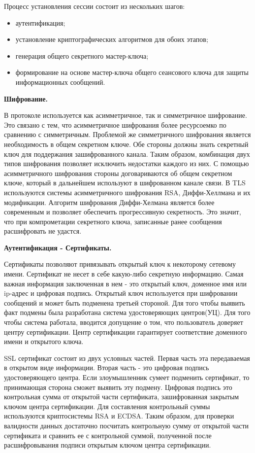Процесс установления сессии состоит из нескольких шагов:
\begin{itemize}
	\item аутентификация;
	\item установление криптографических алгоритмов для обоих этапов;
	\item генерация общего секретного мастер-ключа;
	\item формирование на основе мастер-ключа общего сеансового ключа для защиты информационных сообщений.
\end{itemize}

\textbf{Шифрование.}

В протоколе используется как асимметричное, так и симметричное шифрование. Это связано с тем, что асимметричное шифрования более ресурсоемко по сравнению с симметричным. Проблемой же симметричного шифрования является необходимость в общем секретном ключе. Обе стороны должны знать секретный ключ для поддержания зашифрованного канала. Таким образом, комбинация двух типов шифрования позволяет исключить недостатки каждого из них. С помощью асимметричного шифрования стороны договариваются об общем секретном ключе, который в дальнейшем используют в шифрованном канале связи. В TLS используются системы асимметричного шифрования RSA, Диффи-Хеллмана и их модификации. Алгоритм шифрования Диффи-Хелмана является более современным и позволяет обеспечить прогрессивную секретность. Это значит, что при компрометации секретного ключа, записанные ранее сообщения расшифровать не удастся.

\textbf{Аутентификация - Сертификаты.}

Сертификаты позволяют привязывать открытый ключ к некоторому сетевому имени. Сертификат не несет в себе какую-либо секретную информацию. Самая важная информация заключенная в нем - это открытый ключ, доменное имя или ip-адрес и цифровая подпись. Открытый ключ используется при шифровании сообщений и может быть подменена третьей стороной. Для того чтобы выявить факт подмены была разработана система удостоверяющих центров(УЦ). Для того чтобы система работала, вводится допущение о том, что пользователь доверяет центру сертификации. Центр сертификации гарантирует соответствие доменного имени и открытого ключа.

SSL сертификат состоит из двух условных частей. Первая часть эта передаваемая в открытом виде информации. Вторая часть - это цифровая подпись удостоверяющего центра. Если злоумышленник сумеет подменить сертификат, то принимающая сторона сможет выявить эту подмену. Цифровая подпись это контрольная сумма от открытой части сертификата, зашифрованная закрытым ключом центра сертификации. Для составления контрольный суммы используются криптосистемы RSA и ECDSA. Таким образом, для проверки валидности данных достаточно посчитать контрольную сумму от открытой части сертификата и сравнить ее с контрольной суммой, полученной после расшифровывания подписи открытым ключом центра сертификации.

